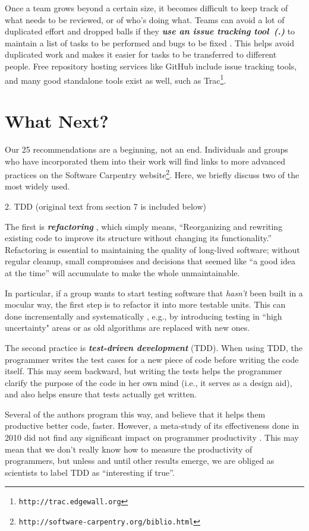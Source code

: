 \documentclass{article}
\newcommand{\footurl}[1]{\footnote{\texttt{#1}}}
\newcounter{PracticeIdentifier}[section]
\newcommand{\practice}[1]{\stepcounter{PracticeIdentifier}\textbf{\emph{{#1}~(\arabic{section}.\arabic{PracticeIdentifier})}}}
\begin{document}
Once a team grows beyond a certain size, it becomes difficult to keep
track of what needs to be reviewed, or of who's doing what.  Teams can
avoid a lot of duplicated effort and dropped balls if they
\practice{use an issue tracking tool} to maintain a list of tasks to
be performed and bugs to be fixed \cite{dubois2003a}. This helps avoid
duplicated work and makes it easier for tasks to be transferred to
different people. Free repository hosting services like GitHub include
issue tracking tools, and many good standalone tools exist as well,
such as Trac\footurl{http://trac.edgewall.org}.

\section*{What Next?}

Our 25 recommendations are a beginning, not an end.  Individuals and
groups who have incorporated them into their work will find links to
more advanced practices on the Software Carpentry
website\footurl{http://software-carpentry.org/biblio.html}.  Here,
we briefly discuss two of the most widely used.

2. TDD
(original text from section 7 is included below)

The first is \textbf{\emph{refactoring}}
\cite{fowler1999,kerievsky2004}, which simply means, ``Reorganizing
and rewriting existing code to improve its structure without changing
its functionality.''  Refactoring is essential to maintaining the
quality of long-lived software; without regular cleanup, small
compromises and decisions that seemed like ``a good idea at the time''
will accumulate to make the whole unmaintainable.

In particular, if a group wants to start testing software that
\emph{hasn't} been built in a mocular way, the first step is to
refactor it into more testable units. This can done incrementally and
systematically \cite{feathers2004}, e.g., by introducing testing in
``high uncertainty" areas or as old algorithms are replaced with new
ones.

The second practice is \textbf{\emph{test-driven development}} (TDD).
When using TDD, the programmer writes the test cases for a new piece
of code before writing the code itself.  This may seem backward, but
writing the tests helps the programmer clarify the purpose of the code
in her own mind (i.e., it serves as a design aid), and also helps
ensure that tests actually get written.

Several of the authors program this way, and believe that it helps
them productive better code, faster.  However, a meta-study of its
effectiveness done in 2010 did not find any significant impact on
programmer productivity \cite{turhan2010}.  This may mean that we
don't really know how to measure the productivity of programmers, but
unless and until other results emerge, we are obliged as scientists to
label TDD as ``interesting if true''.
\end{document}
